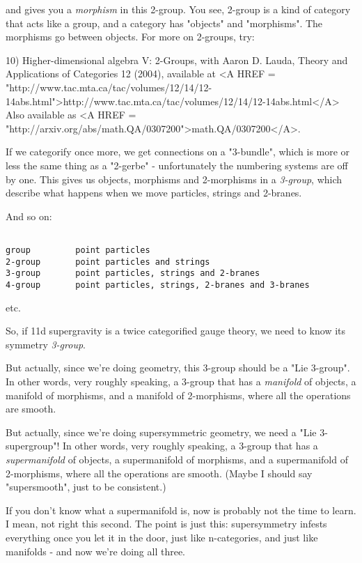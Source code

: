 and gives you a \emph{morphism} in this 2-group.  You see, 2-group
is a kind of category that acts like a group, and a category 
has "objects" and "morphisms".  The morphisms go between objects.  
For more on 2-groups, try:

10) Higher-dimensional algebra V: 2-Groups, with Aaron D. Lauda, 
Theory and Applications of Categories 12 (2004), available at
<A HREF = "http://www.tac.mta.ca/tac/volumes/12/14/12-14abs.html">http://www.tac.mta.ca/tac/volumes/12/14/12-14abs.html</A>  
Also available as <A HREF = "http://arxiv.org/abs/math.QA/0307200">math.QA/0307200</A>.

If we categorify once more, we get connections on a "3-bundle",
which is more or less the same thing as a "2-gerbe" - unfortunately
the numbering systems are off by one.   This gives us objects,
morphisms and 2-morphisms in a \emph{3-group}, which describe what 
happens when we move particles, strings and 2-branes.

And so on:


\begin{verbatim}

group         point particles
2-group       point particles and strings
3-group       point particles, strings and 2-branes
4-group       point particles, strings, 2-branes and 3-branes
\end{verbatim}
    
etc.  

So, if 11d supergravity is a twice categorified gauge theory,
we need to know its symmetry \emph{3-group}.  

But actually, since we're doing geometry, this 3-group should
be a "Lie 3-group".  In other words, very roughly speaking, 
a 3-group that has a \emph{manifold} of objects, a manifold of 
morphisms, and a manifold of 2-morphisms, where all the 
operations are smooth.

But actually, since we're doing supersymmetric geometry, we
need a "Lie 3-supergroup"!  In other words, very roughly
speaking, a 3-group that has a \emph{supermanifold} of objects, 
a supermanifold of morphisms, and a supermanifold of 2-morphisms, 
where all the operations are smooth.  (Maybe I should say 
"supersmooth", just to be consistent.)

If you don't know what a supermanifold is, now is probably 
not the time to learn.  I mean, not right this second.
The point is just this: supersymmetry 
infests everything once you let it in the door, just like 
n-categories, and just like manifolds - and now we're doing all three.   

